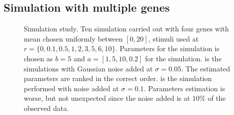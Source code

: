 \subsection{Simulation with multiple genes}
\label{sec:simul-with-mult}
\begin{figure}
  \centering
  \caption{Simulation study. Ten simulation carried out with four genes with mean chosen uniformly between $[0, 20]$, stimuli used at $r =\lbrace 0, 0.1, 0.5, 1, 2, 3, 5, 6, 10 \rbrace$. Parameters for the simulation is chosen as $b=5$ and $a=[1, 5, 10, 0.2]$ for the simulation.  is the simulations with Gaussian noise added at $\sigma = 0.05$. The estimated parameters are ranked in the correct order.  is the simulation performed with noise added at $\sigma = 0.1$. Parameters estimation is worse, but not unexpected since the noise added is at $10\%$ of the observed data.}
  \label{fig:cc-4gn}
\end{figure}


